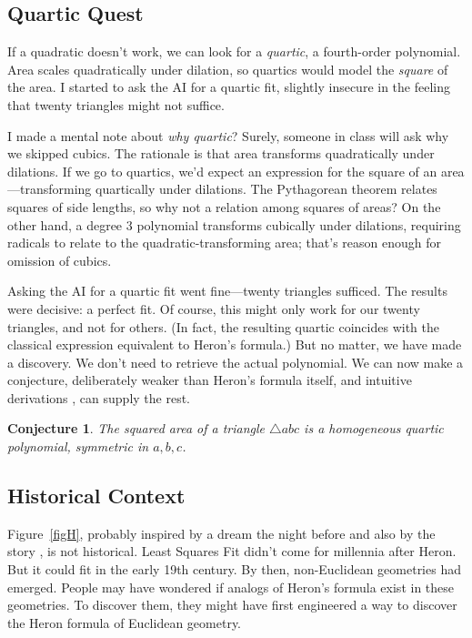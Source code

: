 \documentclass[10.5pt]
{amsart}
\newtheorem*{conjecture}{Conjecture}
\begin{document}
\subsection{Quartic Quest}
If a quadratic doesn't work, we can look for a \emph{quartic}, a fourth-order polynomial. Area scales quadratically under dilation, so quartics would model the \emph{square} of the area. I started to ask the AI for a quartic fit, slightly insecure in the feeling that twenty triangles might not suffice.

\begin{quoting}[leftmargin=0.5em, rightmargin=0.5em]
{\footnotesize I made a mental note about \emph{why quartic}? Surely, someone in class will ask why we skipped cubics. The rationale is that area transforms quadratically under dilations. If we go to quartics, we'd expect an expression for the square of an area---transforming quartically under dilations. The Pythagorean theorem relates squares of side lengths, so why not a relation among squares of areas? On the other hand, a degree $3$ polynomial transforms cubically under dilations, requiring radicals to relate to the quadratic-transforming area; that's reason enough for omission of cubics.
\par }
\end{quoting}

Asking the AI for a quartic fit went fine---twenty triangles sufficed. The results were decisive: a perfect fit. Of course, this might only work for our twenty triangles, and not for others. (In fact, the resulting quartic coincides with the classical expression equivalent to Heron’s formula.) But no matter, we have made a discovery. We don't need to retrieve the actual polynomial. We can now make a conjecture, deliberately weaker than Heron's formula itself, and intuitive derivations \cite{klain-2004},\cite{nelsen-2001} can supply the rest. 


\begin{conjecture}
The squared area of a triangle $\triangle abc$ is a homogeneous quartic polynomial, symmetric in $a,b,c$. \end{conjecture}


\subsection{Historical Context}
Figure~\ref{figH}, probably inspired by a dream the night before and also by the story \cite{clarke-1967}, is not historical. Least Squares Fit didn't come for millennia after Heron. But it could fit in the early 19th century. By then, non-Euclidean geometries had emerged. People may have wondered if analogs of Heron's formula exist in these geometries. To discover them, they might have first engineered a way to discover the Heron formula of Euclidean geometry.  
\end{document}
